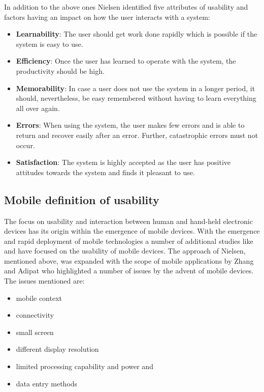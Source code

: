 In addition to the above ones Nielsen \cite{nielsen1994} identified five attributes of usability and factors having an impact on how the user interacts with a system: 

\begin{itemize}
	
	\item \textbf{Learnability}: The user should get work done rapidly which is possible if the system is easy to use.
	\item \textbf{Efficiency}: Once the user has learned to operate with the system, the productivity should be high.
	\item \textbf{Memorability}: In case a user does not use the system in a longer period, it should, nevertheless, be easy remembered without having to learn everything all over again.	
	\item \textbf{Errors}: When using the system, the user makes few errors and is able to return and recover easily after an error. Further, catastrophic errors must not occur.
	\item \textbf{Satisfaction}: The system is highly accepted as the user has positive attitudes towards the system and finds it pleasant to use.
\end{itemize}


\subsection{Mobile definition of usability}

The focus on usability and interaction between human and hand-held electronic devices has its origin within the emergence of mobile devices. With the emergence and rapid deployment of mobile technologies a number of additional studies like \cite{ryu2005development} and \cite{gafni2009usability} have focused on the usability of mobile devices. The approach of Nielsen, mentioned above, was expanded with the scope of mobile applications by Zhang and Adipat \cite{zhang2005challenges} who highlighted a number of issues by the advent of mobile devices. The issues mentioned are:
\begin{itemize}
	
	\item mobile context
	\item connectivity
	\item small screen
	\item different display resolution
	\item limited processing capability and power and
	\item data entry methods
	
\end{itemize}

